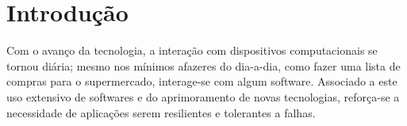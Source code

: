 \documentclass[
    12pt,
    openright, 
    oneside,
    a4paper,
    french,
    english,
    brazil
    ]{facom-ufu-abntex2}
\theoremstyle{definition}
\begin{document}
\imprimircapa
\imprimirfolhaderosto









\tableofcontents*
\cleardoublepage


\textual


\chapter{Introdução}

Com o avanço da tecnologia, a interação com dispositivos computacionais se tornou diária; mesmo
nos mínimos afazeres do dia-a-dia, como fazer uma lista de compras para o supermercado, interage-se com algum software. 
Associado a este uso extensivo de softwares e do aprimoramento de novas tecnologias, reforça-se a necessidade de
aplicações serem resilientes e tolerantes a falhas.
\end{document}
